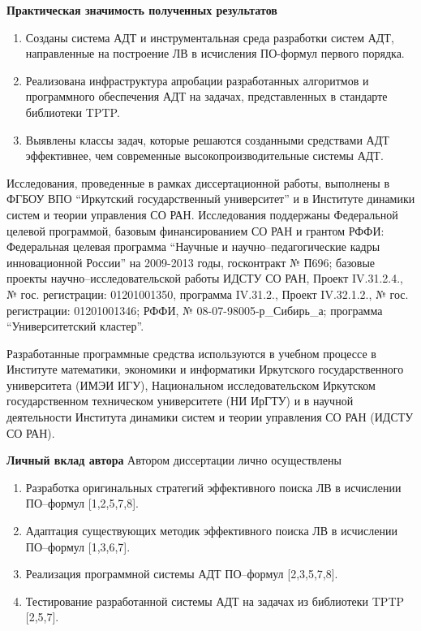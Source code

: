 \documentclass[a4paper]{report}
\begin{document}
\textbf{Практическая значимость полученных результатов}
\begin{enumerate}
\item{} Созданы система АДТ и инструментальная среда разработки систем АДТ, направленные на построение ЛВ в исчисления ПО-формул первого порядка.
\item{} Реализована инфраструктура апробации разработанных алгоритмов и программного обеспечения АДТ на задачах, представленных в стандарте библиотеки TPTP.
\item{} Выявлены классы задач, которые решаются созданными средствами АДТ эффективнее, чем современные высокопроизводительные системы АДТ.
\end{enumerate}

Исследования, проведенные в рамках  диссертационной работы, выполнены в ФГБОУ ВПО ``Иркутский государственный университет'' и в Институте динамики систем и теории управления СО РАН. Исследования поддержаны Федеральной целевой программой, базовым финансированием СО РАН и грантом РФФИ: Федеральная целевая программа ``Нау\-чные и нау\-чно--пе\-да\-го\-ги\-чес\-кие кадры инновационной России'' на 2009-2013 годы, госконтракт № П696; базовые проекты нау\-чно--иссле\-до\-ва\-тель\-ской работы ИДСТУ СО РАН, Проект IV.31.2.4., № гос. регистрации: 01201001350, программа IV.31.2., Проект IV.32.1.2., № гос. регистрации: 01201001346; РФФИ, № 08-07-98005-р\_Сибирь\_а; программа ``Университетский кластер''.

Разработанные программные средства используются в учебном процессе в Институте математики, экономики и информатики Иркутского государственного университета (ИМЭИ ИГУ), Национальном исследовательском Иркутском государственном техническом университете (НИ ИрГТУ) и в научной деятельности Института динамики систем и теории управления СО РАН (ИДСТУ СО РАН).



\textbf{Личный вклад автора}
Автором диссертации лично осуществлены
\begin{enumerate}
\item Разработка оригинальных стратегий эффективного поиска ЛВ в исчислении ПО--формул [1,2,5,7,8].
\item Адаптация существующих методик эффективного поиска ЛВ в исчислении ПО--формул [1,3,6,7].
\item Реализация программной системы АДТ ПО--формул [2,3,5,7,8].
\item Тестирование разработанной системы АДТ на задачах из библиотеки TPTP [2,5,7].
\end{enumerate}
\end{document}

